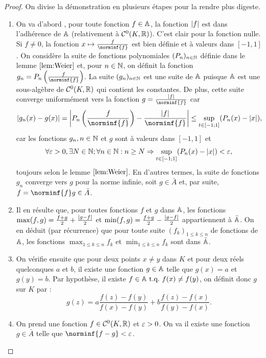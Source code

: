 \begin{proof}
On divise la démonstration en plusieurs étapes pour la rendre plus digeste.
\begin{enumerate}[start=1,label={\bfseries Etape~\arabic* :}, wide, labelwidth=!, labelindent=0pt]
\item
On va d'abord \mq, pour toute fonction $f \in \mathbb{A}$, la fonction $\lvert f\rvert$ est dans l'adhérence de $\mathbb{A}$ (relativement à $\mathcal{C}^0(K, \mathbb{R})$). 
C'est clair pour la fonction nulle. 
Si $f \neq 0$, la fonction $x \mapsto \frac{f}{\norminf{f}}$ est bien définie et à valeurs dans $[-1,1]$.
On considère la suite de fonctions polynomiales $(P_n)_{n \in \mathbb{N}}$ définie dans le lemme $\ref{lem:Weier}$ et,
pour $n \in \mathbb{N}$, on définit la fonction $g_n = P_n \left ( \frac{f}{\norminf{f}} \right )$. 
La suite $(g_n)_{n \in \mathbb{N}}$ est une suite de $\mathbb{A}$ puisque $\mathbb{A}$ est une sous-algèbre de $\mathcal{C}^0(K, \mathbb{R})$ qui contient les constantes.
De plus, cette suite converge uniformément vers la fonction $g = \frac{\abs{f}}{\norminf{f}}$ car
\[ \abs{g_n(x) - g(x)} = \abs*{ P_n \left ( \frac{f}{\norminf{f}} \right ) - \frac{\abs{f}}{\norminf{f}}} \leq 
\sup_{t \in [-1;1]} (P_n(x) - \abs{x}) , \]
car les fonctions $g_n, n \in \mathbb{N}$ et $g$ sont à valeurs dans $[-1,1]$ et
\[ \forall \varepsilon >0, \exists N \in \mathbb{N} ; \forall n \in \mathbb{N} : n \geq N \Rightarrow \sup_{t \in [-1;1]} (P_n(x) - \lvert x\rvert) < \varepsilon , \]
toujours selon le lemme $\ref{lem:Weier}$. En d'autres termes, la suite de fonctions $g_n$ converge vers $g$ pour la norme infinie, 
soit $g \in \bar A$ et, par suite, $f = \norminf{f} g \in \bar A$.
\item
Il en résulte que, pour toutes fonctions $f$ et $g$ dans $\mathbb{A}$, 
les fonctions $\max(f,g)=\frac{f+g}2 + \frac{\lvert g-f\rvert}{2}$ et $\min(f,g)=\frac{f+g}2 - \frac{\lvert g-f\rvert}{2}$ appartiennent à $\bar {\mathbb{A}}$.
On en déduit (par récurrence) que pour toute suite $(f_k)_{1 \leq k \leq n}$ de fonctions de $\mathbb{A}$, 
les fonctions $\max_{1 \leq k \leq n} f_k$ et $\min_{1 \leq k \leq n} f_k$ sont dans $\bar {\mathbb{A}}$.
\item
On vérifie ensuite que pour deux points $x \neq y$ dans $K$ et pour deux réels quelconques $a$ et $b$,
il existe une fonction $g \in \mathbb{A}$ telle que $g(x)=a$ et $g(y)=b$. 
Par hypothèse, il existe $f \in \mathbb{A} \text{~t.q.~} f(x) \neq f(y)$, on définit donc $g$ sur $K$ par :
\[ g(z) = a\dfrac{f(z) - f(y)}{f(x) - f(y)} + b\dfrac{f(z) - f(x)}{f(y) - f(x)} . \]
\item 
On prend une fonction $f \in \mathcal{C}^0(K, \mathbb{R})$ et $\varepsilon >0$. 
On va \mq il existe une fonction $g \in \bar A$ telle que $\norminf{f-g} < \veps$.

\end{enumerate}
\end{proof}
